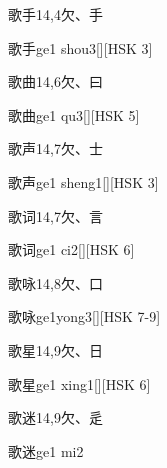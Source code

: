 \begin{Entry}{歌手}{14,4}{⽋、⼿}
  \begin{Phonetics}{歌手}{ge1 shou3}[][HSK 3]
  \end{Phonetics}
\end{Entry}

\begin{Entry}{歌曲}{14,6}{⽋、⽈}
  \begin{Phonetics}{歌曲}{ge1 qu3}[][HSK 5]
  \end{Phonetics}
\end{Entry}

\begin{Entry}{歌声}{14,7}{⽋、⼠}
  \begin{Phonetics}{歌声}{ge1 sheng1}[][HSK 3]
  \end{Phonetics}
\end{Entry}

\begin{Entry}{歌词}{14,7}{⽋、⾔}
  \begin{Phonetics}{歌词}{ge1 ci2}[][HSK 6]
  \end{Phonetics}
\end{Entry}

\begin{Entry}{歌咏}{14,8}{⽋、⼝}
  \begin{Phonetics}{歌咏}{ge1yong3}[][HSK 7-9]
  \end{Phonetics}
\end{Entry}

\begin{Entry}{歌星}{14,9}{⽋、⽇}
  \begin{Phonetics}{歌星}{ge1 xing1}[][HSK 6]
  \end{Phonetics}
\end{Entry}

\begin{Entry}{歌迷}{14,9}{⽋、⾡}
  \begin{Phonetics}{歌迷}{ge1 mi2}
  \end{Phonetics}
\end{Entry}

